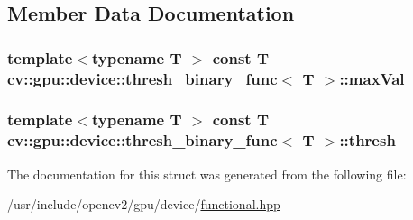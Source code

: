 \subsection{Member Data Documentation}
\hypertarget{structcv_1_1gpu_1_1device_1_1thresh__binary__func_ab20cbde1ae917f2ec9b14f2f21f13625}{
\subsubsection[{max\-Val}]{\setlength{\rightskip}{0pt plus 5cm}template$<$typename T $>$ const {\bf T} {\bf cv\-::gpu\-::device\-::thresh\-\_\-binary\-\_\-func}$<$ {\bf T} $>$\-::max\-Val}}\label{structcv_1_1gpu_1_1device_1_1thresh__binary__func_ab20cbde1ae917f2ec9b14f2f21f13625}
\hypertarget{structcv_1_1gpu_1_1device_1_1thresh__binary__func_a6facab7535ff2276d6d012d9327252bb}{
\subsubsection[{thresh}]{\setlength{\rightskip}{0pt plus 5cm}template$<$typename T $>$ const {\bf T} {\bf cv\-::gpu\-::device\-::thresh\-\_\-binary\-\_\-func}$<$ {\bf T} $>$\-::thresh}}\label{structcv_1_1gpu_1_1device_1_1thresh__binary__func_a6facab7535ff2276d6d012d9327252bb}


The documentation for this struct was generated from the following file\-:\begin{DoxyCompactItemize}
\item 
/usr/include/opencv2/gpu/device/\hyperlink{functional_8hpp}{functional.\-hpp}\end{DoxyCompactItemize}
